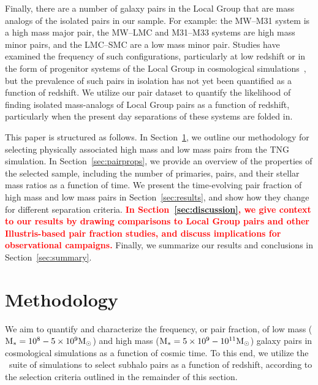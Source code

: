 \documentclass[linenumbers,twocolumn]{aastex631}
\newcommand{\add}[1]{\textcolor{red}{\textbf{#1}}}
\newcommand{\ms}[1]{\ensuremath{M_{*{#1}}}}
\begin{document}
    Finally, there are a number of galaxy pairs in the Local Group that are mass analogs of the isolated pairs in our sample.
    For example: the MW--M31 system is a high mass major pair, the MW--LMC and M31--M33 systems are high mass minor pairs, and the LMC--SMC are a low mass minor pair.
    Studies have examined the frequency of such configurations, particularly at low redshift or in the form of progenitor systems of the Local Group in cosmological simulations~\citep{Bk2011,Fattahi2013,Patel2017a-Orbits,Geha2017,Mao2021}, but the prevalence of such pairs in isolation has not yet been quantified as a function of redshift. 
    We utilize our pair dataset to quantify the likelihood of finding isolated mass-analogs of Local Group pairs as a function of redshift, particularly when the present day separations of these systems are folded in. 
    
    This paper is structured as follows. 
    In Section~\ref{sec:methods}, we outline our methodology for selecting physically associated high mass and low mass pairs from the TNG simulation. 
    In Section~\ref{sec:pairprops}, we provide an overview of the properties of the selected sample, including the number of primaries, pairs, and their stellar mass ratios as a function of time. 
    We present the time-evolving pair fraction of high mass and low mass pairs in Section~\ref{sec:results}, and show how they change for different separation criteria. 
    \add{In Section~\ref{sec:discussion}, we give context to our results by drawing comparisons to Local Group pairs and other Illustris-based pair fraction studies, and discuss implications for observational campaigns.}
    Finally, we summarize our results and conclusions in Section~\ref{sec:summary}.

 
\section{Methodology}\label{sec:methods}
We aim to quantify and characterize the frequency, or pair fraction, of low mass ($\rm\ms{}=10^{8}-5\times 10^{9}\Msun$) and high mass ($\rm\ms{}=5\times10^{9}-10^{11}\Msun$) galaxy pairs in cosmological simulations as a function of cosmic time. 
To this end, we utilize the \tng\ suite of simulations to select subhalo pairs as a function of redshift, according to the selection criteria outlined in the remainder of this section. 
\end{document}
